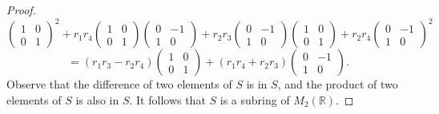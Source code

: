 \documentclass[11pt]{article}
\begin{document}
\begin{enumerate}
\begin{proof}
\[\begin{pmatrix}
            1 & 0 \\ 0 & 1
        \end{pmatrix}^2 + r_1r_4\begin{pmatrix}
            1 & 0 \\ 0 & 1
        \end{pmatrix}\begin{pmatrix}
            0 & -1 \\ 1 & 0 
        \end{pmatrix} + r_2r_3\begin{pmatrix}
            0 & -1 \\ 1 & 0 
        \end{pmatrix}\begin{pmatrix}
            1 & 0 \\ 0 & 1
        \end{pmatrix} + r_2r_4\begin{pmatrix}
            0 & -1 \\ 1 & 0 
        \end{pmatrix}^2\] \[ = (r_1r_3 - r_2r_4)\begin{pmatrix}
            1 & 0 \\ 0 & 1
        \end{pmatrix} + (r_1r_4 + r_2r_3)\begin{pmatrix}
            0 & -1 \\ 1 & 0 
        \end{pmatrix}.\] Observe that the difference of two elements of $S$ is in $S$, and the product of two elements of $S$ is also in $S$. It follows that $S$ is a subring of $M_2(\mathbb{R})$.


\end{proof}
\end{enumerate}
\end{document}
